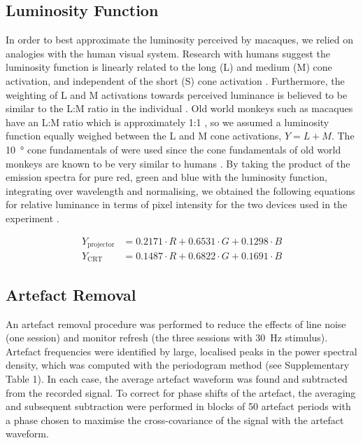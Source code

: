\subsection{Luminosity Function}
In order to best approximate the luminosity perceived by macaques, we relied on analogies with the human visual system.
Research with humans suggest the luminosity function is linearly related to the long (L) and medium (M) cone activation, and independent of the short (S) cone activation \citep{Stockman2008}.
Furthermore, the weighting of L and M activations towards perceived luminance is believed to be similar to the L:M ratio in the individual \citep{Stockman2008}.
Old world monkeys such as macaques have an L:M ratio which is approximately 1:1 \citep{Dobkins2000}, so we assumed a luminosity function equally weighed between the L and M cone activations, $Y=L+M$.
The \SI{10}{\degree} cone fundamentals of \cite{Stockman2000} were used since the cone fundamentals of old world monkeys are known to be very similar to humans \citep{Dobkins2000}.
By taking the product of the emission spectra for pure red, green and blue with the luminosity function, integrating over wavelength and normalising, we obtained the following equations for relative luminance in terms of pixel intensity for the two devices used in the experiment .

\begin{align*}
    Y_{\text{projector}} &= 0.2171 \cdot R + 0.6531 \cdot G + 0.1298 \cdot B\\
    Y_{\text{CRT}}       &= 0.1487 \cdot R + 0.6822 \cdot G + 0.1691 \cdot B
\end{align*}

\subsection{Artefact Removal}
An artefact removal procedure was performed to reduce the effects of line noise (one session) and monitor refresh (the three sessions with \SI{30}{Hz} stimulus).
Artefact frequencies were identified by large, localised peaks in the power spectral density, which was computed with the periodogram method (see Supplementary Table 1).
In each case, the average artefact waveform was found and subtracted from the recorded signal.
To correct for phase shifts of the artefact, the averaging and subsequent subtraction were performed in blocks of 50 artefact periods with a phase chosen to maximise the cross-covariance of the signal with the artefact waveform.

